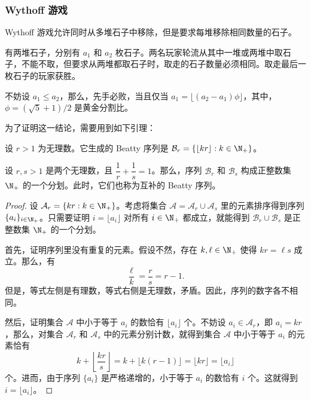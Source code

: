 \newpage

\subsubsection{Wythoff 游戏}

Wythoff 游戏允许同时从多堆石子中移除，但是要求每堆移除相同数量的石子。

\begin{game}[Wythoff]
	有两堆石子，分别有 $a_1$ 和 $a_2$ 枚石子。两名玩家轮流从其中一堆或两堆中取石子，不能不取，但要求从两堆都取石子时，取走的石子数量必须相同。取走最后一枚石子的玩家获胜。
\end{game}

\begin{theorem}
	不妨设 $a_1\le a_2$，那么，先手必败，当且仅当 $a_1 = \lfloor(a_2-a_1)\phi\rfloor$，其中，$\phi=(\sqrt{5}+1)/2$ 是黄金分割比。
\end{theorem}

为了证明这一结论，需要用到如下引理：

\begin{definition}[Beatty 序列]
	设 $r > 1$ 为无理数。它生成的 Beatty 序列是 $\mathcal B_r = \{\lfloor kr\rfloor : k \in\N_+\}$。
\end{definition}

\begin{lemma}[Rayleigh 定理]
	设 $r,s > 1$ 是两个无理数，且 $\dfrac{1}{r}+\dfrac{1}{s}=1$。那么，序列 $\mathcal B_r$ 和 $\mathcal B_s$ 构成正整数集 $\N_+$ 的一个分划。此时，它们也称为互补的 Beatty 序列。
\end{lemma}

\begin{proof}
	设 $\mathcal A_r=\{kr:k\in\N_+\}$。考虑将集合 $\mathcal A=\mathcal A_r\cup\mathcal A_s$ 里的元素排序得到序列 $\{a_i\}_{i\in\N_+}$。只需要证明 $i=\lfloor a_i\rfloor$ 对所有 $i\in\N_+$ 都成立，就能得到 $\mathcal B_r\cup\mathcal B_s$ 是正整数集 $\N_+$ 的一个分划。
	
	首先，证明序列里没有重复的元素。假设不然，存在 $k,\ell\in\N_+$ 使得 $kr=\ell s$ 成立。那么，有
	$$
	\dfrac{\ell}{k} = \dfrac{r}{s} = r - 1.
	$$
	但是，等式左侧是有理数，等式右侧是无理数，矛盾。因此，序列的数字各不相同。
	
	然后，证明集合 $\mathcal A$ 中小于等于 $a_i$ 的数恰有 $\lfloor a_i\rfloor$ 个。不妨设 $a_i\in\mathcal A_r$，即 $a_i=kr$，那么，对集合 $\mathcal A_r$ 和 $\mathcal A_s$ 中的元素分别计数，就得到集合 $\mathcal A$ 中小于等于 $a_i$ 的元素恰有
	$$
	k + \left\lfloor\dfrac{kr}{s}\right\rfloor = k + \lfloor k(r-1)\rfloor = \lfloor kr\rfloor = \lfloor a_i\rfloor
	$$
	个。进而，由于序列 $\{a_i\}$ 是严格递增的，小于等于 $a_i$ 的数恰有 $i$ 个。这就得到 $i=\lfloor a_i\rfloor$。
\end{proof}

